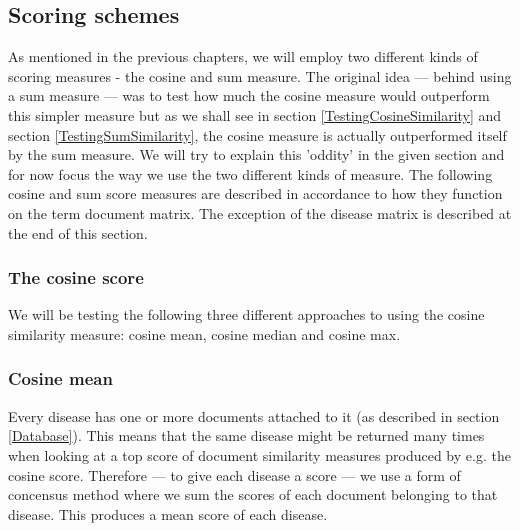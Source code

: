 \subsection{Scoring schemes}

As mentioned in the previous chapters, we will employ two different
kinds of scoring measures - the cosine and sum measure. The original
idea --- behind using a sum measure --- was to test how much the cosine
measure would outperform this simpler measure but as we shall see in
section \ref{TestingCosineSimilarity} and section
\ref{TestingSumSimilarity}, the cosine measure is actually
outperformed itself by the sum measure. We will try to explain this
'oddity' in the given section and for now focus the way we use the two
different kinds of measure. The following cosine and sum score
measures are described in accordance to how they function on the term
document matrix. The exception of the disease matrix is described at
the end of this section.

\subsubsection{The cosine score\label{CosineScore}}

We will be testing the following three different approaches to using
the cosine similarity measure: cosine mean, cosine median and cosine
max.

\subsubsection{Cosine mean}
Every disease has one or more documents attached to it (as described
in section \ref{Database}). This means that the same disease might be
returned many times when looking at a top score of document similarity
measures produced by e.g. the cosine score. Therefore --- to give each
disease a score --- we use a form of concensus method where we sum the
scores of each document belonging to that disease. This produces a
mean score of each disease. \\

